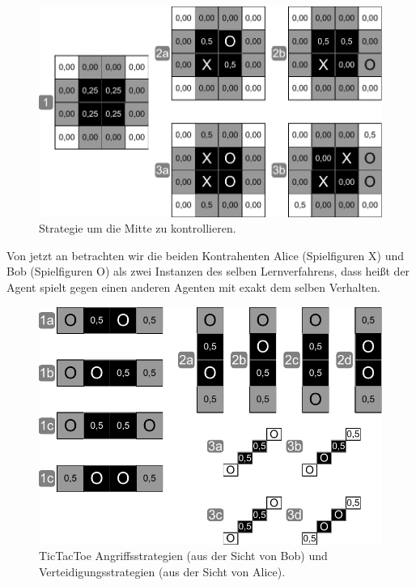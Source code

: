 \begin{figure}[!htbp]
  \centering
  \includegraphics[scale = 0.8]{inhalt/abbildungen/kontrolliere_die_mitte.pdf}
  \caption{Strategie um die Mitte zu kontrollieren.}
  \label{fig:kontrolliere_die_mitte}
\end{figure}


Von jetzt an betrachten wir die beiden Kontrahenten Alice (Spielfiguren X) und Bob (Spielfiguren O) als zwei Instanzen des selben Lernverfahrens, dass heißt der Agent spielt gegen einen anderen Agenten mit exakt dem selben Verhalten. \\

\begin{figure}[!htbp]
  \centering
  \includegraphics[scale = 0.8]{inhalt/abbildungen/verteidigung_ist_angriff.pdf}
  \caption{TicTacToe Angriffsstrategien (aus der Sicht von Bob) und Verteidigungsstrategien (aus der Sicht von Alice).}
  \label{fig:verteidigung_ist_angriff}
\end{figure}

